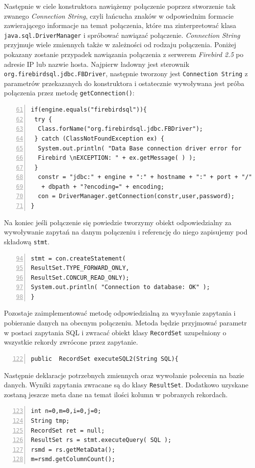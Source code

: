 Następnie w ciele konstruktora nawiążemy połączenie poprzez stworzenie tak zwanego \emph{Connection String}, czyli łańcucha znaków w odpowiednim formacie zawierającego informacje na temat połączenia, które ma zinterpretować klasa \texttt{java.sql.DriverManager} i spróbować nawiązać połączenie. \emph{Connection String} przyjmuje wiele zmiennych także w zależności od rodzaju połączenia. Poniżej pokazany zostanie przypadek nawiązania połączenia z serwerem \emph{Firebird 2.5} po adresie IP lub nazwie hosta. Najpierw ładowny jest sterownik \texttt{org.firebirdsql.jdbc.FBDriver}, następnie tworzony jest \texttt{Connection String} z parametrów przekazanych do konstruktora i ostatecznie wywoływana jest próba połączenia przez metodę \texttt{getConnection()}:
   \begin{lstlisting}[numbers=left,firstnumber=61]
if(engine.equals("firebirdsql")){
 try {
  Class.forName("org.firebirdsql.jdbc.FBDriver");
 } catch (ClassNotFoundException ex) {
  System.out.println( "Data Base connection driver error for 
  Firebird \nEXCEPTION: " + ex.getMessage( ) );
 }
  constr = "jdbc:" + engine + ":" + hostname + ":" + port + "/"
   + dbpath + "?encoding=" + encoding;
  con = DriverManager.getConnection(constr,user,password);
}
\end{lstlisting}

Na koniec jeśli połączenie się powiedzie tworzymy obiekt odpowiedzialny za wywoływanie zapytań na danym połączeniu i referencję do niego zapisujemy pod składową \texttt{stmt}.
\begin{lstlisting}[numbers=left,firstnumber=94]
stmt = con.createStatement(
ResultSet.TYPE_FORWARD_ONLY,
ResultSet.CONCUR_READ_ONLY);
System.out.println( "Connection to database: OK" );
}
\end{lstlisting}

Pozostaje zaimplementować metodę odpowiedzialną za wysyłanie zapytania i pobieranie danych na obecnym połączeniu. Metoda będzie przyjmować parametr w postaci zapytania SQL i zwracać obiekt klasy \texttt{RecordSet} uzupełniony o wszystkie rekordy zwrócone przez zapytanie.
\begin{lstlisting}[numbers=left,firstnumber=122]
public  RecordSet executeSQL2(String SQL){
\end{lstlisting}

Następnie deklaracje potrzebnych zmiennych oraz wywołanie polecenia na bazie danych. Wyniki zapytania zwracane są do klasy \texttt{ResultSet}. Dodatkowo uzyskane zostaną jeszcze meta dane na temat ilości kolumn w pobranych rekordach. 
\begin{lstlisting}[numbers=left,firstnumber=123]
int n=0,m=0,i=0,j=0;
String tmp;
RecordSet ret = null;
ResultSet rs = stmt.executeQuery( SQL );
rsmd = rs.getMetaData();
m=rsmd.getColumnCount();
\end{lstlisting}

